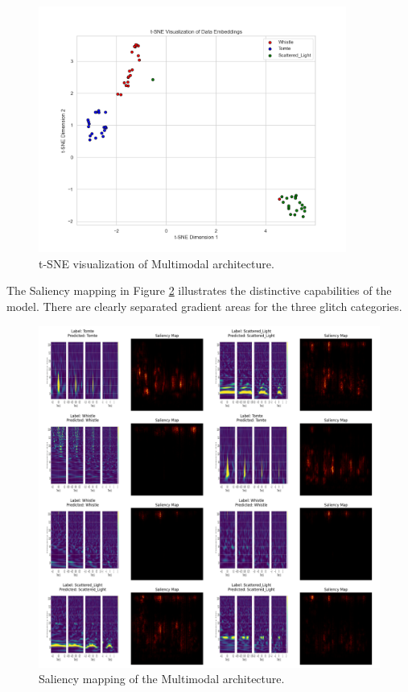 \begin{figure}[H]
    \centering
    \includegraphics[width=0.9\textwidth]{Grad Assignment/Images/tSNE_RQ3_ImageModel_test.png}
    \caption{t-SNE visualization of Multimodal architecture.}
    \label{fig:tsne_multimodal}
\end{figure}
\newpage
The Saliency mapping in Figure \ref{fig:saliency_mapping_multimodal} illustrates the distinctive capabilities of the model. There are clearly separated gradient areas for the three glitch categories. 
\begin{figure}[H]
    \centering
    \includegraphics[width=1.0\textwidth]{Grad Assignment/Images/SaliencyMapping_Multimodal_test.png}
    \caption{Saliency mapping of the Multimodal architecture.}
    \label{fig:saliency_mapping_multimodal}
\end{figure}
